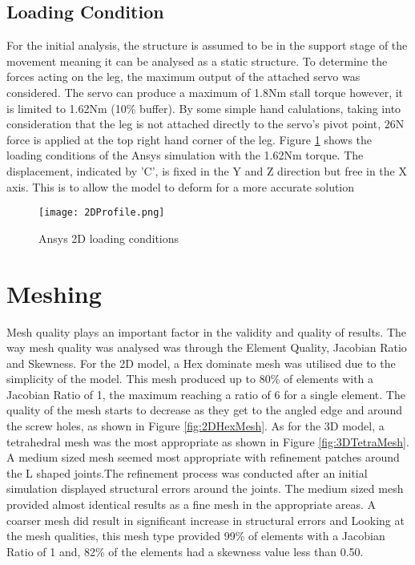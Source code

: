 \documentclass[a4paper]{article}
\begin{document}
\subsection{Loading Condition}
For the initial analysis, the structure is assumed to be in the support stage of the movement meaning it can be analysed as a static structure. To determine the forces acting on the leg, the maximum output of the attached servo was considered. The servo can produce a maximum of 1.8Nm stall torque however, it is limited to 1.62Nm (10\% buffer). By some simple hand calulations, taking into consideration that the leg is not attached directly to the servo's pivot point, 26N force is applied at the top right hand corner of the leg. Figure \ref{fig:2Dprofile} shows the loading conditions of the Ansys simulation with the 1.62Nm torque. The displacement, indicated by 'C', is fixed in the Y and Z direction but free in the X axis. This is to allow the model to deform for a more accurate solution  
 
\begin{figure}[h]
	\centering
	\texttt{[image: 2DProfile.png]}
	\caption{\label{fig:2Dprofile} Ansys 2D loading conditions}
\end{figure}

\newpage

\section{Meshing}
Mesh quality plays an important factor in the validity and quality of results. The way mesh quality was analysed was through the Element Quality, Jacobian Ratio and Skewness. For the 2D model, a Hex dominate mesh was utilised due to the simplicity of the model. This mesh produced up to 80\% of elements with a Jacobian Ratio of 1, the maximum reaching a ratio of 6 for a single element. The quality of the mesh starts to decrease as they get to the angled edge and around the screw holes, as shown in Figure \ref{fig:2DHexMesh}. As for the 3D model, a tetrahedral mesh was the most appropriate as shown in Figure \ref{fig:3DTetraMesh}. A medium sized mesh seemed most appropriate with refinement patches around the L shaped joints.The refinement process was conducted after an initial simulation displayed structural errors around the joints. The medium sized mesh provided almost identical results as a fine mesh in the appropriate areas. A coarser mesh did result in significant increase in structural errors and  Looking at the mesh qualities, this mesh type provided 99\% of elements with a Jacobian Ratio of 1 and, 82\% of the elements had a skewness value less than 0.50. 
 
\end{document}
